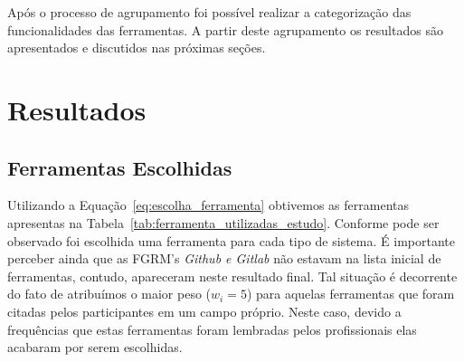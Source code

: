 Após o processo de agrupamento foi possível realizar a categorização das
funcionalidades das ferramentas. A partir deste agrupamento os resultados são
apresentados e discutidos nas próximas seções. 

\section{Resultados}
\label{sec:resultados}

\subsection{Ferramentas Escolhidas}
\label{subsec:resultados_ferramentas_escolhidas}
Utilizando a Equação~\ref{eq:escolha_ferramenta} obtivemos as ferramentas
apresentas na Tabela~\ref{tab:ferramenta_utilizadas_estudo}. Conforme pode ser
observado foi escolhida uma ferramenta para cada tipo de sistema. É importante
perceber ainda que as FGRM's \textit{Github e Gitlab} não estavam na lista
inicial de ferramentas, contudo, apareceram neste resultado final. Tal situação é
decorrente do fato de atribuímos o maior peso ($w_i = 5$) para aquelas
ferramentas que foram citadas pelos participantes em um campo próprio.  Neste
caso, devido a frequências que estas ferramentas foram lembradas pelos
profissionais elas acabaram por serem escolhidas. 

\begin{table}[htb]
\centering
\caption{Ferramentas utilizados no estudo}
\label{tab:ferramenta_utilizadas_estudo}
\end{table}


